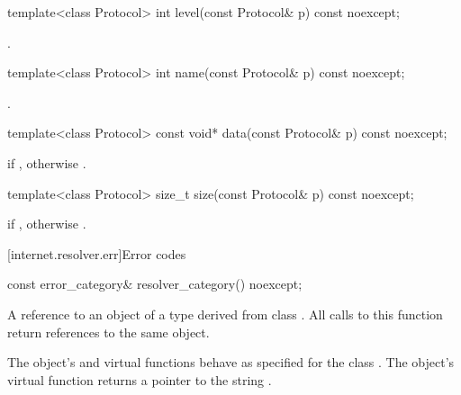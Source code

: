 \begin{itemdecl}
template<class Protocol> int level(const Protocol& p) const noexcept;
\end{itemdecl}

\begin{itemdescr}
\pnum
\returns {}.
\end{itemdescr}

\begin{itemdecl}
template<class Protocol> int name(const Protocol& p) const noexcept;
\end{itemdecl}

\begin{itemdescr}
\pnum
\returns {}.
\end{itemdescr}

\begin{itemdecl}
template<class Protocol> const void* data(const Protocol& p) const noexcept;
\end{itemdecl}

\begin{itemdescr}
\pnum
\returns {} if , otherwise .
\end{itemdescr}

\begin{itemdecl}
template<class Protocol> size_t size(const Protocol& p) const noexcept;
\end{itemdecl}

\begin{itemdescr}
\pnum
\returns {} if , otherwise .
\end{itemdescr}




%
[internet.resolver.err]{Error codes}

%
\begin{itemdecl}
const error_category& resolver_category() noexcept;
\end{itemdecl}

\begin{itemdescr}
\pnum
\returns A reference to an object of a type derived from class . All calls to this function return references to the same object.

\pnum
The object's  and  virtual functions behave as specified for the class . The object's  virtual function returns a pointer to the string .
\end{itemdescr}

